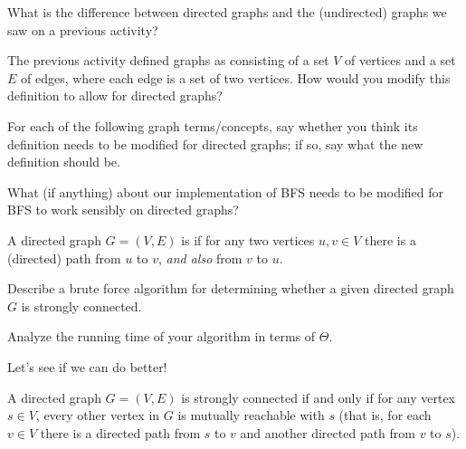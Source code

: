 \documentclass{tufte-handout}
\begin{document}
\begin{questions}
  \item What is the difference between directed graphs and the
    (undirected) graphs we saw on a previous activity?
  \item The previous activity defined graphs as consisting of a set
    $V$ of vertices and a set $E$ of edges, where each edge is a set
    of two vertices.  How would you modify this definition to allow
    for directed graphs?
  \item For each of the following graph terms/concepts, say whether
    you think its definition needs to be modified for directed graphs;
    if so, say what the new definition should be.
    \begin{questions}
    \item {}
    \item {}
    \item {}
    \item {}
    \end{questions}
    \newpage
  \item What (if anything) about our implementation of BFS needs to be
    modified for BFS to work sensibly on directed graphs?
\end{questions}

\begin{defn}
  A directed graph $G = (V,E)$ is  if for any two
  vertices $u,v \in V$ there is a (directed) path from $u$ to $v$,
  \emph{and also} from $v$ to $u$.
\end{defn}

\begin{questions}
  \item Describe a brute force algorithm for determining whether a
    given directed graph $G$ is strongly connected.
  \item Analyze the running time of your algorithm in terms of $\Theta$.
\end{questions}

\pause

\noindent Let's see if we can do better!

\begin{thm} \label{thm:strong-conn}
  A directed graph $G = (V,E)$ is strongly connected if and only if
  for any vertex $s \in V$, every other vertex in $G$
  is mutually reachable with $s$ (that is, for each $v \in V$ there is
  a directed path from $s$ to $v$ and another directed path from $v$
  to $s$).
\end{thm}
\end{document}
